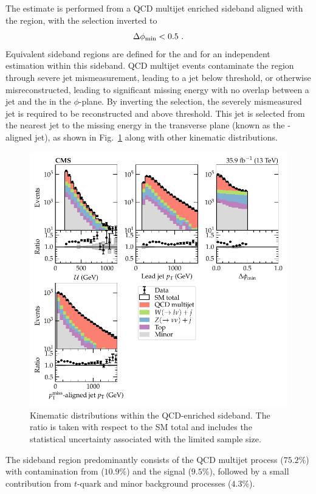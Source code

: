 The estimate is performed from a QCD multijet enriched sideband aligned with the \metplusjets region, with the \mindphi selection inverted to
%
\begin{equation}
    \Delta\phi_{\mathrm{min}} < 0.5\ .
\end{equation}
%
Equivalent sideband regions are defined for the \muplusjets and \eleplusjets for an independent \IWj estimation within this sideband. QCD multijet events contaminate the \metplusjets region through severe jet mismeasurement, leading to a jet below threshold, or otherwise misreconstructed, leading to significant missing energy with no overlap between a jet and the \ptmiss in the $\phi$-plane. By inverting the \mindphi selection, the severely mismeasured jet is required to be reconstructed and above threshold. This jet is selected from the nearest jet to the missing energy in the transverse plane (known as the \ptmiss-aligned jet), as shown in Fig.~\ref{fig:monojetqcd-nearest-jet-pt} along with other kinematic distributions.
%
\begin{figure}
    \centering
    \includegraphics{chapters/042_backgrounds/images/monojetqcd_dists.pdf}
    \caption[QCD-enriched sideband kinematics.]{
        Kinematic distributions within the QCD-enriched sideband. The ratio is taken with respect to the SM total and includes the statistical uncertainty associated with the limited sample size.
    }
    \label{fig:monojetqcd-nearest-jet-pt}
\end{figure}
%
The sideband region predominantly consists of the QCD multijet process ($75.2\%$) with contamination from \IWlvj ($10.9\%$) and the signal \IZvvj ($9.5\%$), followed by a small contribution from $t$-quark and minor background processes ($4.3\%$).

